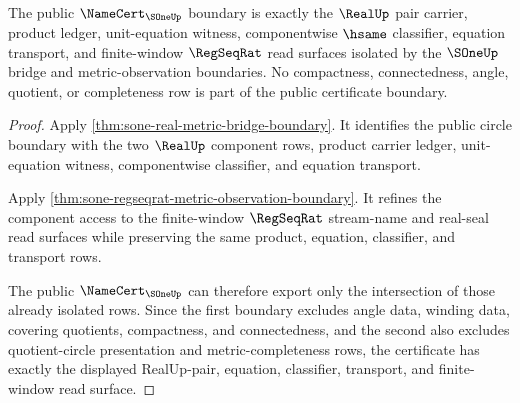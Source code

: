 \begin{theorem}
\label{thm:sone-public-certificate-boundary}
The public $\NameCert_{\SOneUp}$ boundary is exactly the $\RealUp$ pair
carrier, product ledger, unit-equation witness, componentwise $\hsame$
classifier, equation transport, and finite-window $\RegSeqRat$ read surfaces
isolated by the $\SOneUp$ bridge and metric-observation boundaries. No
compactness, connectedness, angle, quotient, or completeness row is part of the
public certificate boundary.
\end{theorem}
\begin{proof}
Apply \autoref{thm:sone-real-metric-bridge-boundary}. It identifies the public
circle boundary with the two $\RealUp$ component rows, product carrier ledger,
unit-equation witness, componentwise classifier, and equation transport.

Apply \autoref{thm:sone-regseqrat-metric-observation-boundary}. It refines the
component access to the finite-window $\RegSeqRat$ stream-name and real-seal
read surfaces while preserving the same product, equation, classifier, and
transport rows.

The public $\NameCert_{\SOneUp}$ can therefore export only the intersection of
those already isolated rows. Since the first boundary excludes angle data,
winding data, covering quotients, compactness, and connectedness, and the
second also excludes quotient-circle presentation and metric-completeness rows,
the certificate has exactly the displayed RealUp-pair, equation, classifier,
transport, and finite-window read surface.
\end{proof}

